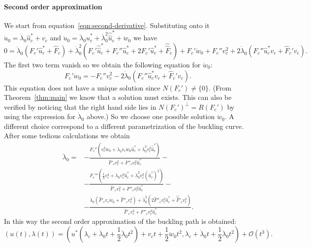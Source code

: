 \documentclass[a4paper,11pt]{article}
\theoremstyle{definition}
\begin{document}
\paragraph{Second order approximation} We start from equation~\eqref{eqn:second-derivative}. Substituting onto it $\dot u_0=\dot\lambda_0\hat u^*_c+v_c$ and $\ddot u_0=\ddot\lambda_0\hat u^*_c+\dot\lambda_0^2\hat{\hat{ u}}^*_c+\ddot w_0$ we have
\[
0=\ddot\lambda_0(F_c'\hat u_c^*+\hat F_c)+\dot\lambda_0^2(F_c'\hat{\hat u}^*_c+F_c''\hat u_c^*+2F_c'\hat u_c^*+\hat{\hat F}_c)+F_c'\ddot w_0+F_c''v_c^2+2\dot\lambda_0(F_c''\hat u_c^*v_c+\hat F_c'v_c).
\]
The first two term vanish so we obtain the following equation for $\ddot w_0$:
\begin{equation}
\label{eqn:w-ddot}
F_c'\ddot w_0=-F_c''v_c^2-2\dot\lambda_0(F_c''\hat u_c^*v_c+\hat F_c'v_c).
\end{equation}
This equation does not have a unique solution since $N(F_c')\neq\{0\}$. (From Theorem~\ref{thm:main} we know that a solution must exists. This can also be verified by noticing that the right hand side lies in $N(F_c')^\perp=R(F_c')$ by using the expression for $\dot\lambda_0$ above.) So we choose one possible solution $\ddot w_0$. A different choice correspond to a different parametrization of the buckling curve. After some tedious calculations we obtain
\begin{equation}
\label{eqn:labda-ddot}
\begin{split}
\ddot\lambda_0=&-\frac{F_c''(v_c^2\ddot w_0+\dot\lambda_0v_c\ddot w_0\hat u_c^*+\dot\lambda_0^2v_c^2\hat{\hat u}_c^*)}{\hat F'_cv_c^2+F''_cv_c^2\hat u^*_c}-\\
&-\frac{F_c'''\left(\frac{1}{3}v_c^4+\dot\lambda_0v_c^3\hat u_c^*+\dot\lambda_0^2v_c^2(\hat u_c^*)^2\right)}{\hat F'_cv_c^2+F''_cv_c^2\hat u^*_c}-\\
&-\frac{\dot\lambda_0(\hat F'_cv_c\ddot w_0+\hat{F}''_cv_c^3)+\dot\lambda_0^2(2\hat F''_cv_c^2\hat u^*_c+\hat{\hat F}'_cv_c^2)}{\hat F'_cv_c^2+F''_cv_c^2\hat u^*_c}.
\end{split}
\end{equation}
In this way the second order approximation of the buckling path is obtained:
\[
(u(t),\lambda(t))=\left(u^*\left(\lambda_c+\dot\lambda_0t+\frac{1}{2}\ddot\lambda_0t^2\right)+v_ct+\frac{1}{2}\ddot w_0t^2,\lambda_c+\dot\lambda_0t+\frac{1}{2}\ddot\lambda_0t^2\right)+\mathscr{O}(t^3).
\]
\end{document}
